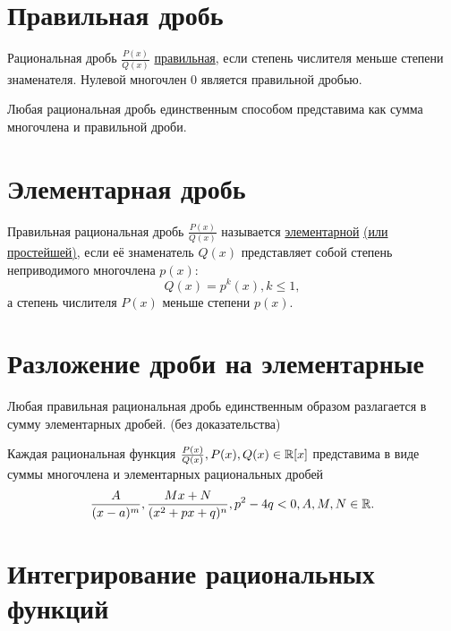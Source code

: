 	\section{Правильная дробь}
	
	\begin{definition}
		Рациональная дробь $\frac{P(x)}{Q(x)}$
		\underline{правильная}, если степень числителя
		меньше степени знаменателя. Нулевой многочлен 0 является правильной дробью.
	\end{definition}
	
	\begin{mention}
		Любая рациональная дробь единственным способом
		представима как сумма многочлена и правильной дроби.
	\end{mention}
	
	\section{Элементарная дробь}
	
	\begin{definition}
		Правильная рациональная дробь $\frac{P(x)}{Q(x)}$ называется \underline{элементарной} \underline{(или простейшей)}, если её знаменатель $Q(x)$ представляет собой степень неприводимого многочлена $p(x)$:
		\[ Q(x) = p^k(x), k \leqslant 1, \]
		а степень числителя $P(x)$ меньше степени $p(x)$.
	\end{definition}
	
	\section{Разложение дроби на элементарные}
	
	\begin{theorem}
		Любая правильная рациональная дробь единственным образом разлагается в сумму элементарных дробей. (без доказательства)
	\end{theorem}
	
	\begin{corollary}
		Каждая рациональная функция $\frac{P(x)}{Q(x)}, P(x), Q(x) \in \mathbb R[x]$
		представима в виде суммы многочлена и элементарных рациональных дробей
		\[\frac{A}{(x - a)^m}, \frac{Mx + N}{(x^2 + px + q)^n}, p^2 - 4q < 0, A, M, N \in \mathbb R.\]
	\end{corollary}
	
	\section{Интегрирование рациональных функций}
	

